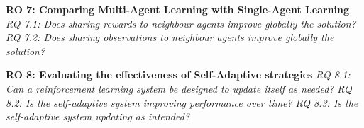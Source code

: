 \hfill \break
\noindent
\textbf{\hypertarget{ro7}{RO 7}: Comparing Multi-Agent Learning with Single-Agent Learning}
\hfill \break
\textit{\hypertarget{rq7.1}{RQ 7.1}: Does sharing rewards to neighbour agents improve globally the solution?}
\hfill \break
\textit{\hypertarget{rq7.2}{RQ 7.2}: Does sharing observations to neighbour agents improve globally the solution?}

\hfill \break
\noindent
\textbf{\hypertarget{ro8}{RO 8}: Evaluating the effectiveness of Self-Adaptive strategies}
\hfill \break
\textit{\hypertarget{rq8.1}{RQ 8.1}: Can a reinforcement learning system be designed to update itself as needed?}
\hfill \break
\textit{\hypertarget{rq8.2}{RQ 8.2}: Is the self-adaptive system improving performance over time?}
\hfill \break
\textit{\hypertarget{rq8.3}{RQ 8.3}: Is the self-adaptive system updating as intended?}

